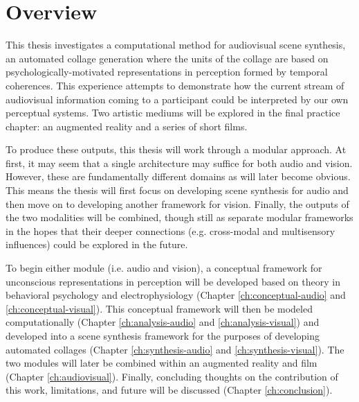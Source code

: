\documentclass[a4paper,10pt,final]{ThesisStyle}
\begin{document}
\section{Overview}

This thesis investigates a computational method for audiovisual scene synthesis, an automated collage generation where the units of the collage are based on psychologically-motivated representations in perception formed by temporal coherences.  This experience attempts to demonstrate how the current stream of audiovisual information coming to a participant could be interpreted by our own perceptual systems.  Two artistic mediums will be explored in the final practice chapter: an augmented reality and a series of short films.

To produce these outputs, this thesis will work through a modular approach.  At first, it may seem that a single architecture may suffice for both audio and vision.  However, these are fundamentally different domains as will later become obvious.  This means the thesis will first focus on developing scene synthesis for audio and then move on to developing another framework for vision.  Finally, the outputs of the two modalities will be combined, though still as separate modular frameworks in the hopes that their deeper connections (e.g. cross-modal and multisensory influences) could be explored in the future.  

To begin either module (i.e. audio and vision), a conceptual framework for unconscious representations in perception will be developed based on theory in behavioral psychology and electrophysiology (Chapter \ref{ch:conceptual-audio} and \ref{ch:conceptual-visual}).  This conceptual framework will then be modeled computationally (Chapter \ref{ch:analysis-audio} and \ref{ch:analysis-visual}) and developed into a scene synthesis framework for the purposes of developing automated collages (Chapter \ref{ch:synthesis-audio} and \ref{ch:synthesis-visual}).  The two modules will later be combined within an augmented reality and film (Chapter \ref{ch:audiovisual}).  Finally, concluding thoughts on the contribution of this work, limitations, and future will be discussed (Chapter \ref{ch:conclusion}).  



\end{document}

